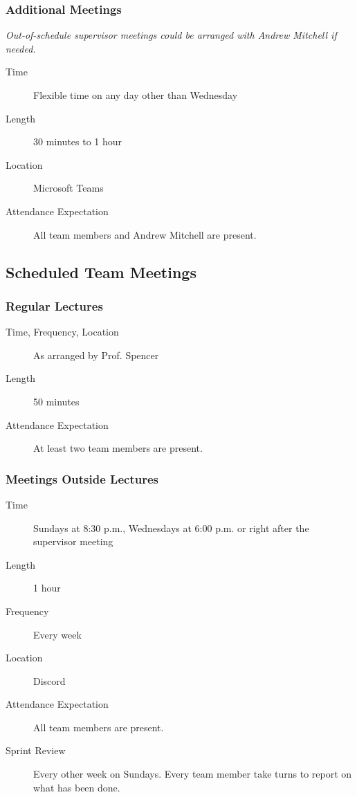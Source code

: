 \documentclass{article}
\begin{document}
\subsubsection{Additional Meetings}

\emph{Out-of-schedule supervisor meetings could be arranged with Andrew Mitchell if
  needed.}

\begin{description}
\item[Time] Flexible time on any day other than Wednesday
\item[Length] 30 minutes to 1 hour
\item[Location] Microsoft Teams
\item[Attendance Expectation] All team members and Andrew Mitchell are present.
\end{description}

\subsection{Scheduled Team Meetings}

\subsubsection{Regular Lectures}

\begin{description}
\item[Time, Frequency, Location] As arranged by Prof. Spencer
\item[Length] 50 minutes
\item[Attendance Expectation] At least two team members are present.
\end{description}

\subsubsection{Meetings Outside Lectures}

\begin{description}
\item[Time] Sundays at 8:30 p.m., Wednesdays at 6:00 p.m. or right after the
  supervisor meeting
\item[Length] 1 hour
\item[Frequency] Every week
\item[Location] Discord
\item[Attendance Expectation] All team members are present.
\item[Sprint Review] Every other week on Sundays. Every team member take turns to
  report on what has been done.
\end{description}
\end{document}
